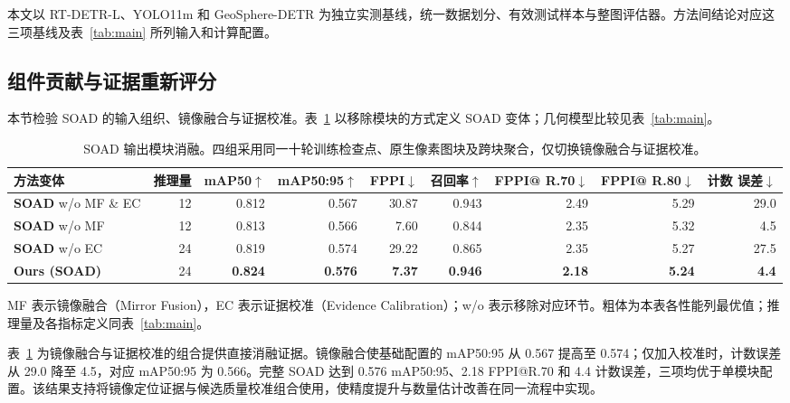 \documentclass[11pt,a4paper]{ctexart}
\begin{document}
本文以 RT-DETR-L、YOLO11m 和 GeoSphere-DETR 为独立实测基线，统一数据划分、有效测试样本与整图评估器。方法间结论对应这三项基线及表~\ref{tab:main} 所列输入和计算配置。

\subsection{组件贡献与证据重新评分}
本节检验 SOAD 的输入组织、镜像融合与证据校准。表~\ref{tab:configs} 以移除模块的方式定义 SOAD 变体；几何模型比较见表~\ref{tab:main}。

\begin{table}[H]
\centering
\scriptsize\setlength{\tabcolsep}{2.1pt}
\caption{SOAD 输出模块消融。四组采用同一十轮训练检查点、原生像素图块及跨块聚合，仅切换镜像融合与证据校准。}
\label{tab:configs}
\begin{tabular}{lrrrrrrrr}
\toprule
方法变体 & 推理量 & mAP50$\uparrow$ & mAP50:95$\uparrow$ & FPPI$\downarrow$ & 召回率$\uparrow$ & \shortstack{FPPI@\\R.70$\downarrow$} & \shortstack{FPPI@\\R.80$\downarrow$} & \shortstack{计数\\误差$\downarrow$} \\
\midrule
\textbf{SOAD} w/o MF \& EC & 12 & 0.812 & 0.567 & 30.87 & 0.943 & 2.49 & 5.29 & 29.0 \\
\textbf{SOAD} w/o MF & 12 & 0.813 & 0.566 & 7.60 & 0.844 & 2.35 & 5.32 & 4.5 \\
\textbf{SOAD} w/o EC & 24 & 0.819 & 0.574 & 29.22 & 0.865 & 2.35 & 5.27 & 27.5 \\
\midrule
\textbf{Ours (SOAD)} & 24 & \textbf{0.824} & \textbf{0.576} & \textbf{7.37} & \textbf{0.946} & \textbf{2.18} & \textbf{5.24} & \textbf{4.4} \\
\bottomrule
\end{tabular}
\par\vspace{2pt}\parbox{0.97\linewidth}{\footnotesize MF 表示镜像融合（Mirror Fusion），EC 表示证据校准（Evidence Calibration）；w/o 表示移除对应环节。粗体为本表各性能列最优值；推理量及各指标定义同表~\ref{tab:main}。}
\end{table}
表~\ref{tab:configs} 为镜像融合与证据校准的组合提供直接消融证据。镜像融合使基础配置的 mAP50:95 从 0.567 提高至 0.574；仅加入校准时，计数误差从 29.0 降至 4.5，对应 mAP50:95 为 0.566。完整 SOAD 达到 0.576 mAP50:95、2.18 FPPI@R.70 和 4.4 计数误差，三项均优于单模块配置。该结果支持将镜像定位证据与候选质量校准组合使用，使精度提升与数量估计改善在同一流程中实现。
\end{document}
